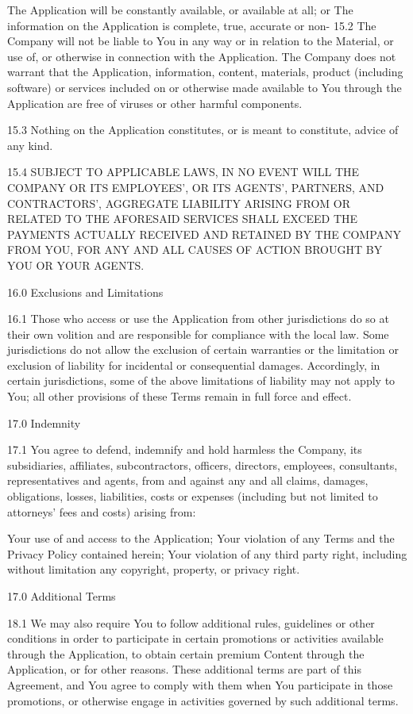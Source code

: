 The Application will be constantly available, or available at all; or
The information on the Application is complete, true, accurate or non-
15.2       The Company will not be liable to You in any way or in relation to the Material, or use of, or otherwise in connection with the Application. The Company does not warrant that the Application, information, content, materials, product (including software) or services included on or otherwise made available to You through the Application are free of viruses or other harmful components.

15.3       Nothing on the Application constitutes, or is meant to constitute, advice of any kind.

15.4       SUBJECT TO APPLICABLE LAWS, IN NO EVENT WILL THE COMPANY OR ITS EMPLOYEES’, OR ITS AGENTS’, PARTNERS, AND CONTRACTORS’, AGGREGATE LIABILITY ARISING FROM OR RELATED TO THE AFORESAID SERVICES SHALL EXCEED THE PAYMENTS ACTUALLY RECEIVED AND RETAINED BY THE COMPANY FROM YOU, FOR ANY AND ALL CAUSES OF ACTION BROUGHT BY YOU OR YOUR AGENTS.

 

16.0       Exclusions and Limitations

16.1      Those who access or use the Application from other jurisdictions do so at their own volition and are responsible for compliance with the local law. Some jurisdictions do not allow the exclusion of certain warranties or the limitation or exclusion of liability for incidental or consequential damages. Accordingly, in certain jurisdictions, some of the above limitations of liability may not apply to You; all other provisions of these Terms remain in full force and effect.

 

17.0      Indemnity

17.1      You agree to defend, indemnify and hold harmless the Company, its subsidiaries, affiliates, subcontractors, officers, directors, employees, consultants, representatives and agents, from and against any and all claims, damages, obligations, losses, liabilities, costs or expenses (including but not limited to attorneys’ fees and costs) arising from:

Your use of and access to the Application;
Your violation of any Terms and the Privacy Policy contained herein;
Your violation of any third party right, including without limitation any copyright, property, or privacy right.
 

17.0     Additional Terms

18.1      We may also require You to follow additional rules, guidelines or other conditions in order to participate in certain promotions or activities available through the Application, to obtain certain premium Content through the Application, or for other reasons. These additional terms are part of this Agreement, and You agree to comply with them when You participate in those promotions, or otherwise engage in activities governed by such additional terms.

